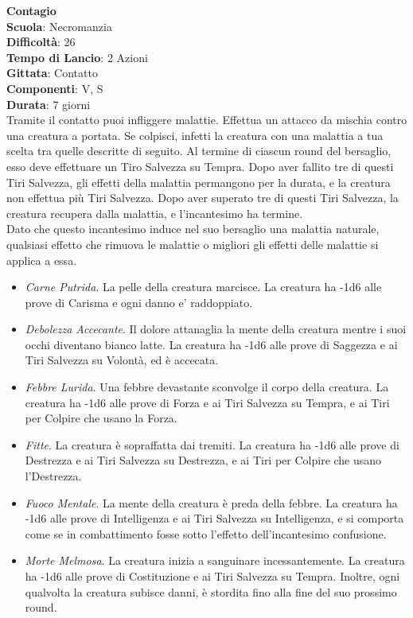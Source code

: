 \begin{multicols}{2}
\medskip\textbf{Contagio}\\
\textbf{Scuola}: Necromanzia\\
\textbf{Difficoltà}: 26\\
\textbf{Tempo di Lancio}: 2 Azioni\\
\textbf{Gittata}: Contatto\\
\textbf{Componenti}: V, S\\
\textbf{Durata}: 7 giorni\\
Tramite il contatto puoi infliggere malattie. Effettua un attacco da mischia contro una creatura a portata. Se colpisci, infetti la creatura con una malattia a tua scelta tra quelle descritte di seguito. Al termine di ciascun round del bersaglio, esso deve effettuare un Tiro Salvezza su Tempra. Dopo aver fallito tre di questi Tiri Salvezza, gli effetti della malattia permangono per la durata, e la creatura non effettua più Tiri Salvezza. Dopo aver superato tre di questi Tiri Salvezza, la creatura recupera dalla malattia, e l'incantesimo ha termine. \\
Dato che questo incantesimo induce nel suo bersaglio una malattia naturale, qualsiasi effetto che rimuova le malattie o migliori gli effetti delle malattie si applica a essa.\\
\begin{itemize}
	\item 
	\textit{Carne Putrida}. La pelle della creatura marcisce. La creatura ha -1d6 alle prove di Carisma e ogni danno e' raddoppiato.
\item 
	\textit{Debolezza Accecante}. Il dolore attanaglia la mente della creatura mentre i suoi occhi diventano bianco latte. La creatura ha -1d6 alle prove di Saggezza e ai Tiri Salvezza su Volontà, ed è accecata.
\item 
  \textit{Febbre Lurida}. Una febbre devastante sconvolge il corpo della creatura. La creatura ha -1d6 alle prove di Forza e ai Tiri Salvezza su Tempra, e ai Tiri per Colpire che usano la Forza.
\item 
\textit{Fitte}. La creatura è sopraffatta dai tremiti. La creatura ha -1d6 alle prove di Destrezza e ai Tiri Salvezza su Destrezza, e ai Tiri per Colpire che usano l'Destrezza.
\item 
\textit{Fuoco Mentale}. La mente della creatura è preda della febbre. La creatura ha -1d6 alle prove di Intelligenza e ai Tiri Salvezza su Intelligenza, e si comporta come se in combattimento fosse sotto l'effetto dell'incantesimo confusione.
\item 
\textit{Morte Melmosa}. La creatura inizia a sanguinare incessantemente. La creatura ha -1d6 alle prove di Costituzione e ai Tiri Salvezza su Tempra. Inoltre, ogni qualvolta la creatura subisce danni, è stordita fino alla fine del suo prossimo round.
\end{itemize}


\end{multicols}

